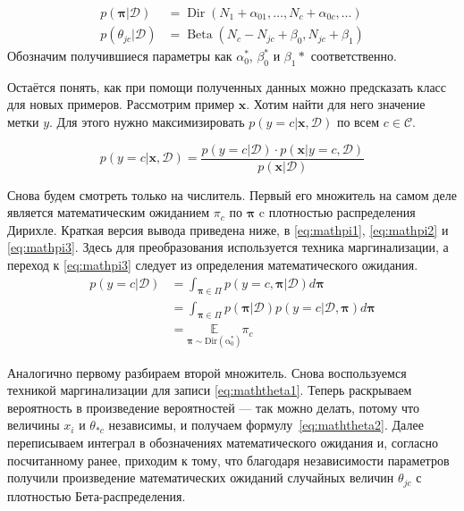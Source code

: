 \begin{align}
  p(\mathbf{\pi}|\mathcal{D}) &= \operatorname{Dir}(N_1+\alpha_{01},\ldots,N_c+\alpha_{0c},\ldots)\label{eq:pi}\\
  p(\theta_{jc}|\mathcal{D}) &= \operatorname{Beta}(N_c-N_{jc} + \beta_0, N_{jc}+\beta_1) \label{eq:thetajc}
\end{align}
Обозначим получившиеся параметры как $\alpha_0^*$, $\beta_0^*$ и $\beta_1*$ соответственно.

Остаётся понять, как при помощи полученных данных можно предсказать класс для новых
примеров. Рассмотрим пример $\mathbf{x}$. Хотим найти для него значение метки $y$. Для этого нужно
максимизировать $p(y=c|\mathbf{x},\mathcal{D})$ по всем $c\in\mathcal{C}$.

\begin{equation}
  p(y=c|\mathbf{x},\mathcal{D}) =
  \frac{p(y=c|\mathcal{D})\cdot p(\mathbf{x}|y=c,\mathcal{D})}{p(\mathbf{x}|\mathcal{D})}
  \label{eq:bnbpred}
\end{equation}

Снова будем смотреть только на числитель. Первый его множитель на самом деле является математическим
ожиданием $\pi_c$ по $\mathbf{\pi}$ c плотностью распределения Дирихле. Краткая версия вывода
приведена ниже, в \ref{eq:mathpi1}, \ref{eq:mathpi2} и \ref{eq:mathpi3}. Здесь для
преобразования \label{eq:mathpi1} используется техника маргинализации, а переход к \ref{eq:mathpi3}
следует из определения математического ожидания.
\begin{align}
  p(y=c|\mathcal{D})&=\int_{\mathbf{\pi}\in\Pi}p(y=c,\mathbf{\pi}|\mathcal{D})d\mathbf{\pi}\label{eq:mathpi1}\\
  &= \int_{\mathbf{\pi}\in\Pi}p(\mathbf{\pi}|\mathcal{D})p(y=c|\mathcal{D},\mathbf{\pi})d\mathbf{\pi}\label{eq:mathpi2}\\
  &= \underset{\mathbf{\pi}\sim\operatorname{Dir(\alpha_0^*)}}{\mathbb{E}}\pi_c
  \label{eq:mathpi3}
\end{align}

Аналогично первому разбираем второй множитель. Снова воспользуемся техникой маргинализации
для записи \ref{eq:maththeta1}. Теперь раскрываем вероятность  в произведение вероятностей
--- так можно делать, потому что величины $x_i$ и $\theta_{*c}$ независимы, и получаем
 формулу~\ref{eq:maththeta2}. Далее переписываем интеграл в обозначениях математического ожидания и, согласно
посчитанному ранее, приходим к тому, что благодаря независимости параметров получили произведение
математических ожиданий случайных величин $\theta_{jc}$ с плотностью Бета-распределения.

